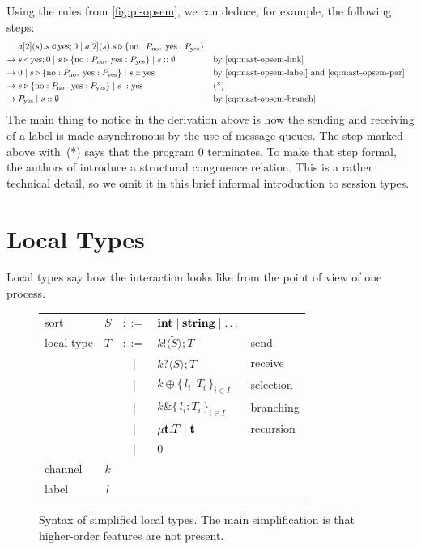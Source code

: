 \documentclass[a4paper,12pt,oneside,fleqn]{book} %
\begin{document}
Using the rules from \autoref{fig:pi-opsem},
  we can deduce, for example, the following steps:
\begin{align*}
  & \bar{a}[2](s). s\triangleleft {\rm yes}; 0
    \mid a[2](s). s\triangleright\{{\rm no} : P_{\rm no},\;
      {\rm yes} : P_{\rm yes} \}
\\
  \to\;
  & s\triangleleft {\rm yes}; 0
    \mid s\triangleright\{{\rm no} : P_{\rm no},\;{\rm yes} : P_{\rm yes}\}
    \mid s :: \emptyset
    &&\text{by \eqref{eq:mast-opsem-link}}
\\
  \to\;
  & 0
    \mid s\triangleright\{{\rm no} : P_{\rm no},\;{\rm yes} : P_{\rm yes}\}
    \mid s :: {\rm yes}
    &&\text{by \eqref{eq:mast-opsem-label} and \eqref{eq:mast-opsem-par}}
\\
  \to\;
  & s\triangleright\{{\rm no} : P_{\rm no},\;{\rm yes} : P_{\rm yes}\}
    \mid s :: {\rm yes}
    &&\text{(*)}
\\
  \to\;
  & P_{\rm yes} \mid s :: \emptyset
  &&\text{by \eqref{eq:mast-opsem-branch}}
\end{align*}
The main thing to notice in the derivation above
  is how the sending and receiving of a label is made
    asynchronous by the use of message queues.
The step marked above with~(*) says that the program 0 terminates.
To make that step formal,
  the authors of \cite{DBLP:journals/jacm/HondaYC16} introduce a
    structural congruence relation.
This is a rather technical detail,
  so we omit it in this brief informal introduction to session types.

\section{Local Types}
\label{sec:mast-local}

Local types say how the interaction looks like from the point of view of
one process.

\begin{figure}
\begin{center}
\begin{tabular}{lccll}
sort & $S$ & $::=$ & ${\bf int} \mid {\bf string} \mid \ldots$ \\
local type & $T$
  & $::=$ & $k! \langle\tilde{S}\rangle; T$ & send \\
 && $\mid$ & $k? \langle\tilde{S}\rangle; T$ & receive \\
 && $\mid$ & $k \oplus \{\,l_i:T_i\,\}_{i\in I}$ & selection \\
 && $\mid$ & $k \& \{\,l_i:T_i\,\}_{i\in I}$ & branching \\
 && $\mid$ & $\mu{\bf t}.T \mid {\bf t}$ & recursion \\
 && $\mid$ & $0$ \\
channel & $k$ \\
label & $l$
\end{tabular}
\end{center}
\caption{
  Syntax of simplified local types.
  The main simplification is that higher-order features are not present.
}
\end{figure}
\end{document}
